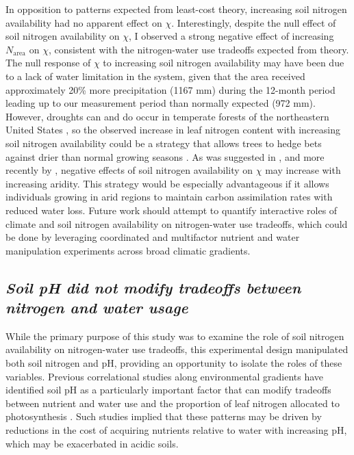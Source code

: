 In opposition to patterns expected from least-cost theory, increasing soil nitrogen availability had no apparent effect on $\chi$. Interestingly, despite the null effect of soil nitrogen availability on $\chi$, I observed a strong negative effect of increasing $N_\mathrm{area}$ on $\chi$, consistent with the nitrogen-water use tradeoffs expected from theory. The null response of $\chi$ to increasing soil nitrogen availability may have been due to a lack of water limitation in the system, given that the area received approximately 20\% more precipitation (1167 mm) during the 12-month period leading up to our measurement period than normally expected (972 mm). However, droughts can and do occur in temperate forests of the northeastern United States , so the observed increase in leaf nitrogen content with increasing soil nitrogen availability could be a strategy that allows trees to hedge bets against drier than normal growing seasons . As was suggested in , and more recently by , negative effects of soil nitrogen availability on $\chi$ may increase with increasing aridity. This strategy would be especially advantageous if it allows individuals growing in arid regions to maintain carbon assimilation rates with reduced water loss. Future work should attempt to quantify interactive roles of climate and soil nitrogen availability on nitrogen-water use tradeoffs, which could be done by leveraging coordinated and multifactor nutrient  and water  manipulation experiments across broad climatic gradients.
    
\subsection{\textit{Soil pH did not modify tradeoffs between nitrogen and water usage}}
\noindent While the primary purpose of this study was to examine the role of soil nitrogen availability on nitrogen-water use tradeoffs, this experimental design manipulated both soil nitrogen and pH, providing an opportunity to isolate the roles of these variables. Previous correlational studies along environmental gradients have identified soil pH as a particularly important factor that can modify tradeoffs between nutrient and water use  and the proportion of leaf nitrogen allocated to photosynthesis . Such studies implied that these patterns may be driven by reductions in the cost of acquiring nutrients relative to water with increasing pH, which may be exacerbated in acidic soils.

